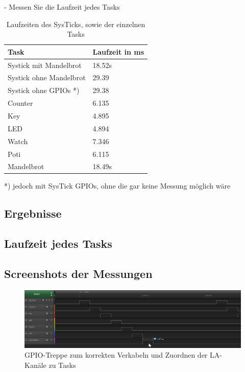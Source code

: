 \documentclass{article}
\begin{document}
-  Messen Sie die Laufzeit jedes Tasks \\

	\begin{table}[h!]
		\begin{center}		
			\begin{tabular}{ l | l }	 %
				Task & Laufzeit in ms \\ \hline
				Systick mit Mandelbrot	& 18.52s \\ \hline
				Systick ohne Mandelbrot	& 29.39 	\\ \hline
				Systick ohne GPIOs *)	& 29.38 \\ \hline
				Counter	& 6.135 \\ \hline
				Key& 4.895 \\ \hline
				LED	& 4.894 \\ \hline
				Watch	& 7.346 \\ \hline
				Poti	& 6.115 \\ \hline
				Mandelbrot	& 18.49s \\ %
			\end{tabular}
			\caption{Laufzeiten des SysTicks, sowie der einzelnen Tasks}
		\end{center}		
	\end{table}

		

	*) jedoch mit SysTick GPIOs, ohne die gar keine Messung möglich wäre
	
\subsection{Ergebnisse}
\subsection{Laufzeit jedes Tasks}
\subsection{ Screenshots der Messungen }

	\begin{figure}[h!]
		\begin{center}
			\includegraphics[width=.8\textwidth]{tryGPIO}
			\caption{GPIO-Treppe zum korrekten Verkabeln und Zuordnen der LA-Kanäle zu Tasks}
		\end{center}
	\end{figure}
\end{document}
